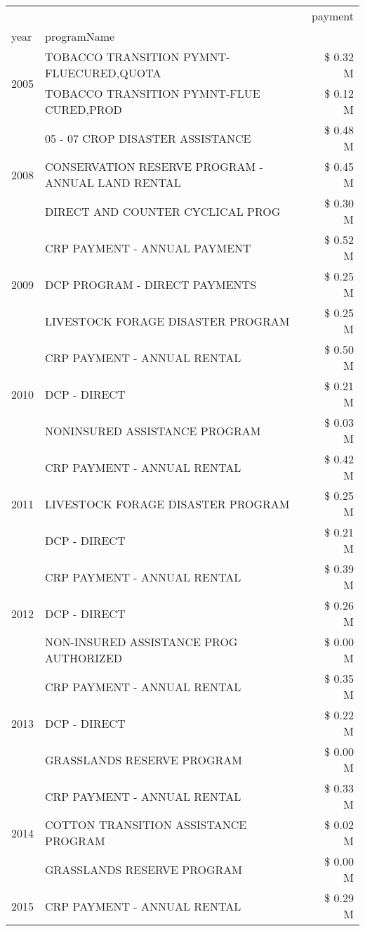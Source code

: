 \begin{tabular}{llr}
\toprule
 &  & payment \\
year & programName &  \\
\midrule
\multirow[t]{2}{*}{2005} & TOBACCO TRANSITION PYMNT-FLUECURED,QUOTA & \$ 0.32 M \\
 & TOBACCO TRANSITION PYMNT-FLUE CURED,PROD & \$ 0.12 M \\
\cline{1-3}
\multirow[t]{3}{*}{2008} & 05 - 07 CROP DISASTER ASSISTANCE & \$ 0.48 M \\
 & CONSERVATION RESERVE PROGRAM - ANNUAL LAND RENTAL & \$ 0.45 M \\
 & DIRECT AND COUNTER CYCLICAL PROG & \$ 0.30 M \\
\cline{1-3}
\multirow[t]{3}{*}{2009} & CRP PAYMENT - ANNUAL PAYMENT & \$ 0.52 M \\
 & DCP PROGRAM - DIRECT PAYMENTS & \$ 0.25 M \\
 & LIVESTOCK FORAGE DISASTER  PROGRAM & \$ 0.25 M \\
\cline{1-3}
\multirow[t]{3}{*}{2010} & CRP PAYMENT - ANNUAL RENTAL & \$ 0.50 M \\
 & DCP - DIRECT & \$ 0.21 M \\
 & NONINSURED ASSISTANCE PROGRAM & \$ 0.03 M \\
\cline{1-3}
\multirow[t]{3}{*}{2011} & CRP PAYMENT - ANNUAL RENTAL & \$ 0.42 M \\
 & LIVESTOCK FORAGE DISASTER PROGRAM & \$ 0.25 M \\
 & DCP - DIRECT & \$ 0.21 M \\
\cline{1-3}
\multirow[t]{3}{*}{2012} & CRP PAYMENT - ANNUAL RENTAL & \$ 0.39 M \\
 & DCP - DIRECT & \$ 0.26 M \\
 & NON-INSURED ASSISTANCE PROG AUTHORIZED & \$ 0.00 M \\
\cline{1-3}
\multirow[t]{3}{*}{2013} & CRP PAYMENT - ANNUAL RENTAL & \$ 0.35 M \\
 & DCP - DIRECT & \$ 0.22 M \\
 & GRASSLANDS RESERVE PROGRAM & \$ 0.00 M \\
\cline{1-3}
\multirow[t]{3}{*}{2014} & CRP PAYMENT - ANNUAL RENTAL & \$ 0.33 M \\
 & COTTON TRANSITION ASSISTANCE PROGRAM & \$ 0.02 M \\
 & GRASSLANDS RESERVE PROGRAM & \$ 0.00 M \\
\cline{1-3}
\multirow[t]{3}{*}{2015} & CRP PAYMENT - ANNUAL RENTAL & \$ 0.29 M \\

\end{tabular}
